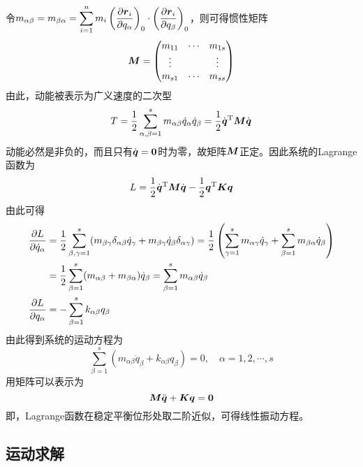 令$\displaystyle m_{\alpha\beta} = m_{\beta\alpha} = \sum_{i=1}^n m_i \left(\frac{\partial \boldsymbol{r}_i}{\partial q_\alpha}\right)_0 \cdot \left(\frac{\partial \boldsymbol{r}_i}{\partial q_\beta}\right)_0$，则可得惯性矩阵
\begin{equation*}
	\boldsymbol{M} = \begin{pmatrix} m_{11} & \cdots & m_{1s} \\ \vdots & & \vdots \\ m_{s1} & \cdots & m_{ss} \end{pmatrix}
\end{equation*}
由此，动能被表示为广义速度的二次型
\begin{equation}
	T = \frac12 \sum_{\alpha,\beta=1}^s m_{\alpha\beta} \dot{q}_\alpha \dot{q}_\beta = \frac12 \dot{\boldsymbol{q}}^{\mathrm{T}} \boldsymbol{M} \dot{\boldsymbol{q}}
\end{equation}
动能必然是非负的，而且只有$\dot{\boldsymbol{q}}=\boldsymbol{0}$时为零，故矩阵$\boldsymbol{M}$正定。因此系统的Lagrange函数为
\begin{equation*}
	L = \frac12 \dot{\boldsymbol{q}}^{\mathrm{T}} \boldsymbol{M} \dot{\boldsymbol{q}} - \frac12 \boldsymbol{q}^{\mathrm{T}} \boldsymbol{K} \boldsymbol{q}
\end{equation*}
由此可得
\begin{align*}
	\frac{\partial L}{\partial \dot{q}_\alpha} & = \frac12 \sum_{\beta,\gamma=1}^s (m_{\beta\gamma}\delta_{\alpha\beta} \dot{q}_\gamma + m_{\beta\gamma}\dot{q}_\beta \delta_{\alpha\gamma}) = \frac12 \left(\sum_{\gamma=1}^s m_{\alpha\gamma} \dot{q}_\gamma + \sum_{\beta=1}^s m_{\beta\alpha} \dot{q}_\beta\right) \\
	& = \frac12 \sum_{\beta=1}^s (m_{\alpha\beta} + m_{\beta\alpha}) \dot{q}_\beta = \sum_{\beta=1}^s m_{\alpha\beta} \dot{q}_\beta \\
	\frac{\partial L}{\partial q_\alpha} & = -\sum_{\beta=1}^s k_{\alpha\beta} q_\beta
\end{align*}
由此得到系统的运动方程为
\begin{equation*}
	\sum_{\beta=1}^s (m_{\alpha\beta} \ddot{q}_\beta + k_{\alpha\beta} q_\beta) = 0,\quad \alpha=1,2,\cdots,s
\end{equation*}
用矩阵可以表示为
\begin{equation}
	\boldsymbol{M} \ddot{\boldsymbol{q}} + \boldsymbol{K} \boldsymbol{q} = \boldsymbol{0}
	\label{多自由度微振动系统的运动方程}
\end{equation}
即，Lagrange函数在稳定平衡位形处取二阶近似，可得线性振动方程。

\subsection{运动求解}

